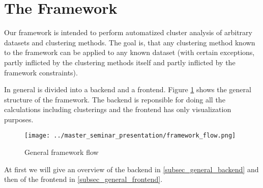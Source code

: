 
	\section{The Framework}
	Our framework \clusteval is intended to perform automatized cluster analysis of arbitrary datasets and clustering methods. The goal is, that any clustering method known to the framework can be applied to any known dataset (with certain exceptions, partly inflicted by the clustering methods itself and partly inflicted by the framework constraints).
	
	In general \clusteval is divided into a backend and a frontend. Figure \ref{fig_general_structure} shows the general structure of the framework. The backend is reponsible for doing all the calculations including clusterings and the frontend has only visualization purposes.

\begin{figure}[hbtp]
\caption{General framework flow}
\label{fig_general_structure}
\centering
\texttt{[image: ../master\_seminar\_presentation/framework\_flow.png]}
\end{figure} 

At first we will give an overview of the backend in \ref{subsec_general_backend} and then of the frontend in \ref{subsec_general_frontend}.